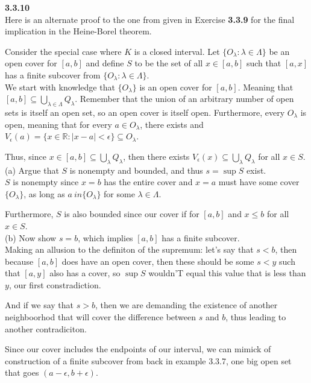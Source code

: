 \textbf{3.3.10}
\\

Here is an alternate proof to the one from given in Exercise \textbf{3.3.9}
for the final implication in the Heine-Borel theorem.

Consider the special case where $K$ is a closed interval.
Let $\{ O_\lambda : \lambda \in \Lambda \}$ be an open cover for $[a,b]$
and define $S$ to be the set of all $x \in [a,b]$ such that
$[a,x]$ has a finite subcover from $\{ O_\lambda : \lambda \in \Lambda \}$.
\\


We start with knowledge that $\{O_\lambda\}$ is an open cover for $[a,b]$.
Meaning that $[a,b] \subseteq \bigcup_{\lambda \in \Lambda} Q_\lambda$.
Remember that the union of an arbitrary number of open sets is itself an open set, so an open cover is itself open.
Furthermore, every $O_\lambda$ is open, meaning that for every $a \in O_\lambda$, there exists
and $V_\epsilon (a) = \{ x\in\mathbb{R} : |x-a| < \epsilon \} \subseteq O_\lambda$.

Thus, since $x \in [a,b] \subseteq \bigcup_{\lambda} Q_\lambda$, then there exists
$V_\epsilon (x) \subseteq \bigcup_{\lambda} Q_\lambda$ for all $x \in S$.
\\


(a) Argue that $S$ is nonempty and bounded, and thus $s = \sup S$ exist.
\\
$S$ is nonempty since $x=b$ has the entire cover and $x=a$ must have some cover $\{ O_\lambda \}$,
as long as $a \ in \{O_\lambda \}$ for some $\lambda \in \Lambda$.

Furthermore, $S$ is also bounded since our cover if for $[a,b]$ and $x \leq b$ for all $x \in S$.
\\


(b) Now show $s = b$, which implies $[a,b]$ has a finite subcover.
\\

Making an allusion to the definiton of the supremum: let's say that $s < b$, then because $[a,b]$ does
have an open cover, then these should be some $s < y$ such that $[a,y]$ also has a cover, so $\sup S$ wouldn'T
equal this value that is less than $y$, our first constradiction.

And if we say that $s > b$, then we are demanding the existence of another neighboorhod that will cover
the difference between $s$ and $b$, thus leading to another contradiciton.

Since our cover includes the endpoints of our interval, we can mimick of construction of a finite subcover from
back in example 3.3.7, one big open set that goes $(a-\epsilon , b+\epsilon)$.
\\


